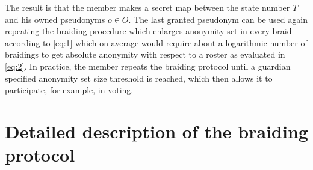 \documentclass[12pt]{article}
\begin{document}
The result is that the member makes a secret map between the state number $T$ and his owned pseudonyms $o \in O$. The last granted pseudonym can be used again repeating the braiding procedure which enlarges anonymity set in every braid according to \cref{eq:1} which on average would require about a logarithmic number of braidings to get absolute anonymity with respect to a roster as evaluated in \cref{eq:2}. In practice, the member repeats the braiding protocol until a guardian specified anonymity set size threshold is reached, which then allows it to participate, for example, in voting.


\section*{Detailed description of the braiding protocol}
\end{document}
